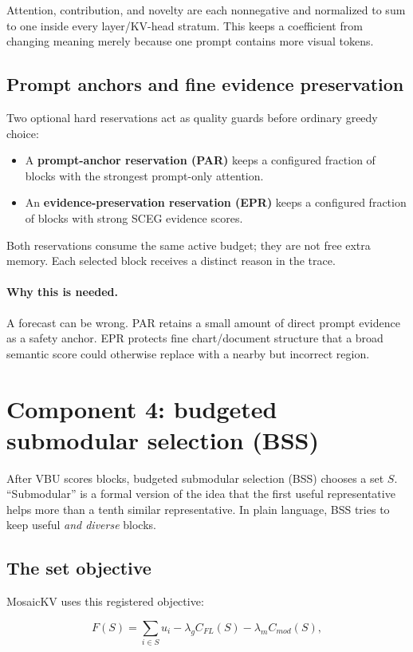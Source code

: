 \documentclass[11pt]{article}
\newcommand{\term}[1]{\textbf{#1}}
\newcommand{\why}{\paragraph{Why this is needed.}}
\begin{document}
Attention, contribution, and novelty are each nonnegative and normalized to sum to one inside
every layer/KV-head stratum. This keeps a coefficient from changing meaning merely because one
prompt contains more visual tokens.

\subsection{Prompt anchors and fine evidence preservation}

Two optional hard reservations act as quality guards before ordinary greedy choice:

\begin{itemize}
  \item A \term{prompt-anchor reservation (PAR)} keeps a configured fraction of blocks with the
        strongest prompt-only attention.
  \item An \term{evidence-preservation reservation (EPR)} keeps a configured fraction of blocks
        with strong SCEG evidence scores.
\end{itemize}

Both reservations consume the same active budget; they are not free extra memory. Each selected
block receives a distinct reason in the trace.

\why A forecast can be wrong. PAR retains a small amount of direct prompt evidence as a safety
anchor. EPR protects fine chart/document structure that a broad semantic score could otherwise
replace with a nearby but incorrect region.

\section{Component 4: budgeted submodular selection (BSS)}
\label{sec:selection}

After VBU scores blocks, budgeted submodular selection (BSS) chooses a set $S$. ``Submodular'' is a
formal version of the idea that the first useful representative helps more than a tenth similar
representative. In plain language, BSS tries to keep useful \emph{and diverse} blocks.

\subsection{The set objective}

MosaicKV uses this registered objective:

\begin{equation}
  F(S)=\sum_{i\in S}u_i
  -\lambda_g C_{FL}(S)
  -\lambda_m C_{mod}(S),
  \label{eq:set-objective}
\end{equation}
\end{document}
